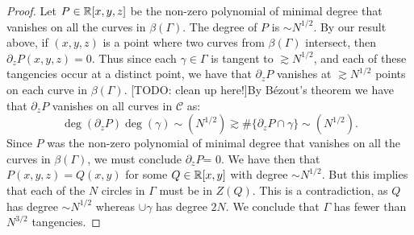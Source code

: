 \begin{proof}
    Let $P \in \mathbb R[x,y,z]$ be the non-zero polynomial of minimal degree that vanishes on all the curves in $\beta (\Gamma)$. The degree of $P$ is $\sim N^{1/2}$. 
    By our result above, if $(x,y,z)$ is a point where two curves from $\beta (\Gamma)$ intersect, then $\partial_z P (x,y,z)  =0 $. Thus since each $\gamma \in \Gamma$ is 
    tangent to $\gtrsim N^{1/2}$, and each of these tangencies occur at a distinct point, we have that $\partial_z P$ vanishes at $\gtrsim N^{1/2}$ points on each curve in $\beta (\Gamma)$.
    [TODO: clean up here!]By Bézout's theorem we have that $\partial_z P$ vanishes on all curves in $\mathscr{C}$ as:
    \[
    \deg (\partial_z P) \deg (\gamma) \sim  (N^{1/2}) \gtrsim \# \{\partial_z P \cap \gamma\} \sim (N^{1/2}) .    
    \] Since $P$ was the non-zero polynomial of minimal degree that vanishes on all the curves in $\beta (\Gamma)$, we must conclude 
    $\partial_z P$= 0. We have then that $P(x,y,z) = Q(x,y)$ for some $Q \in \mathbb R[x,y]$ with degree $\sim N^{1/2}$. 
    But this implies that each of the $N$ circles in $\Gamma$ must be in $Z(Q)$. This is a contradiction, as $Q$ has degree $\sim N^{1/2}$ whereas $\cup \gamma$ has degree $2N$.
    We conclude that $\Gamma$ has fewer than $N^{3/2}$ tangencies.



\end{proof}